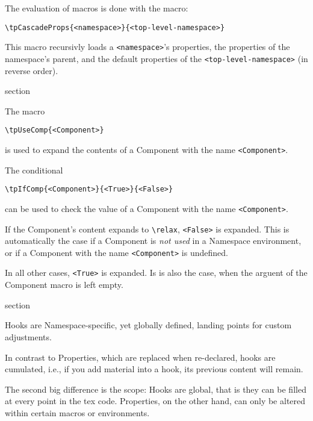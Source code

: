 The evaluation of macros is done with the macro:
\begin{lstlisting}[style=tex]
\tpCascadeProps{<namespace>}{<top-level-namespace>}
\end{lstlisting}
This macro recursivly loads a \lstinline{<namespace>}'s properties, the
properties of the namespace's parent, and the default properties of the
\lstinline{<top-level-namespace>} (in reverse order).

\begin{heading}[label=sec:common:components]{section}
\end{heading}

The macro
\begin{lstlisting}[style=tex]
\tpUseComp{<Component>}
\end{lstlisting}
is used to expand the contents of a Component with the name
\lstinline{<Component>}.

The conditional
\begin{lstlisting}[style=tex]
\tpIfComp{<Component>}{<True>}{<False>}
\end{lstlisting}
can be used to check the value of a Component with the name
\lstinline{<Component>}.

If the Component's content expands to \lstinline{\relax},
\lstinline{<False>} is expanded. This is automatically the case if a
Component is \textit{not used} in a Namespace environment, or if a
Component with the name \lstinline{<Component>} is undefined.

In all other cases, \lstinline{<True>} is expanded. Is is also the
case, when the arguent of the Component macro is left empty.

\begin{heading}[label=sec:common:components]{section}
\end{heading}

Hooks are Namespace-specific, yet globally defined, landing points for
custom adjustments.

In contrast to Properties, which are replaced when re-declared, hooks
are cumulated, i.e., if you add material into a hook, its previous
content will remain.

The second big difference is the scope: Hooks are global, that is they
can be filled at every point in the tex code. Properties, on the other
hand, can only be altered within certain macros or environments.

